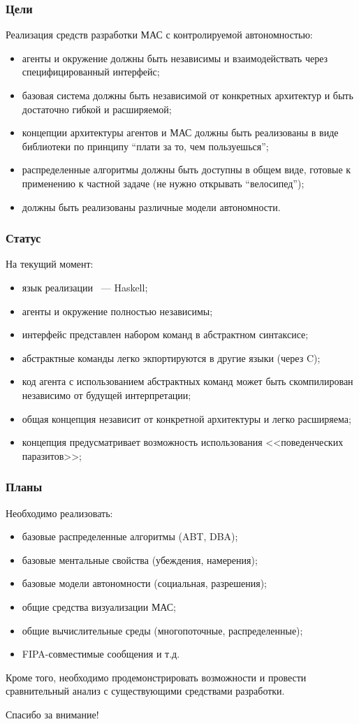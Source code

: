 \documentclass{beamer}
\begin{document}
\begin{frame}
  \frametitle{Цели}
  Реализация средств разработки МАС с контролируемой автономностью:
  \begin{itemize}
    \item агенты и окружение должны быть независимы и взаимодействать через
      специфицированный интерфейс;
    \item базовая система должны быть независимой от конкретных архитектур и
      быть достаточно гибкой и расширяемой;
    \item концепции архитектуры агентов и МАС должны быть реализованы в виде библиотеки
      по принципу ``плати за то, чем пользуешься'';
    \item распределенные алгоритмы должны быть доступны в общем виде, готовые к применению
      к частной задаче (не нужно открывать ``велосипед'');
    \item должны быть реализованы различные модели автономности.
  \end{itemize}
\end{frame}

\begin{frame}
  \frametitle{Статус}
  На текущий момент:
  \begin{itemize}
    \item язык реализации ~--- Haskell;
    \item агенты и окружение полностью независимы;
    \item интерфейс представлен набором команд в абстрактном синтаксисе;
    \item абстрактные команды легко экпортируются в другие языки (через C);
    \item код агента с использованием абстрактных команд может быть скомпилирован
      независимо от будущей интерпретации;
    \item общая концепция независит от конкретной архитектуры и легко расширяема;
    \item концепция предусматривает возможность использования <<поведенческих паразитов>>;
  \end{itemize}
\end{frame}

\begin{frame}
  \frametitle{Планы}
  Необходимо реализовать:
  \begin{itemize}
    \item базовые распределенные алгоритмы (ABT, DBA);
    \item базовые ментальные свойства (убеждения, намерения);
    \item базовые модели автономности (социальная, разрешения);
    \item общие средства визуализации МАС;
    \item общие вычислительные среды (многопоточные, распределенные);
    \item FIPA-совместимые сообщения и т.д.
  \end{itemize}

  Кроме того, необходимо продемонстрировать возможности и провести сравнительный анализ
  с существующими средствами разработки.
\end{frame}

\begin{frame}{}
\addtocounter{framenumber}{-1}
\begin{center}
\LARGE{Спасибо за внимание!}
\end{center}
\end{frame}
\end{document}
